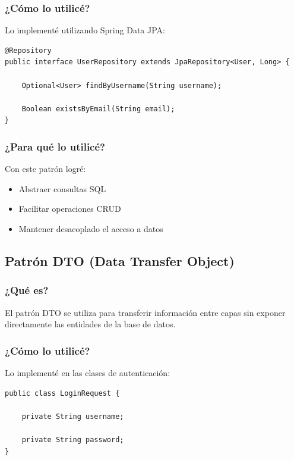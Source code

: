 \documentclass[12pt,a4paper]{article}
\begin{document}
\subsubsection{¿Cómo lo utilicé?}

Lo implementé utilizando Spring Data JPA:

\begin{lstlisting}
@Repository
public interface UserRepository extends JpaRepository<User, Long> {

    Optional<User> findByUsername(String username);

    Boolean existsByEmail(String email);
}
\end{lstlisting}

\subsubsection{¿Para qué lo utilicé?}

Con este patrón logré:

\begin{itemize}
    \item Abstraer consultas SQL
    \item Facilitar operaciones CRUD
    \item Mantener desacoplado el acceso a datos
\end{itemize}

\subsection{Patrón DTO (Data Transfer Object)}

\subsubsection{¿Qué es?}

El patrón DTO se utiliza para transferir información entre capas sin exponer directamente las entidades de la base de datos.

\subsubsection{¿Cómo lo utilicé?}

Lo implementé en las clases de autenticación:

\begin{lstlisting}
public class LoginRequest {

    private String username;

    private String password;
}
\end{lstlisting}
\end{document}
